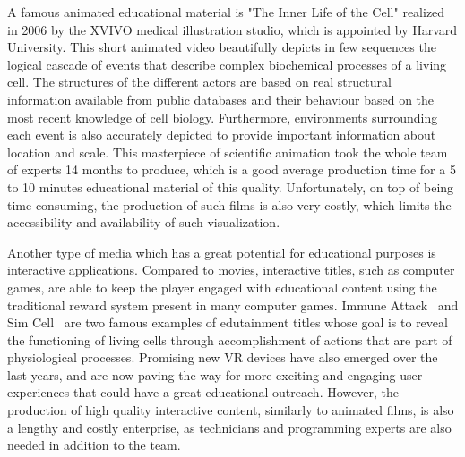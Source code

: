 A famous animated educational material is "The Inner Life of the Cell" \cite{inner2006} realized in 2006 by the XVIVO medical illustration studio, which is appointed by Harvard University.
This short animated video beautifully depicts in few sequences the logical cascade of events that describe complex biochemical processes of a living cell.
The structures of the different actors are based on real structural information available from public databases and their behaviour based on the most recent knowledge of cell biology.
Furthermore, environments surrounding each event is also accurately depicted to provide important information about location and scale.
This masterpiece of scientific animation took the whole team of experts 14 months to produce, which is a good average production time for a 5 to 10 minutes educational material of this quality.
Unfortunately, on top of being time consuming, the production of such films is also very costly, which limits the accessibility and availability of such visualization.

Another type of media which has a great potential for educational purposes is interactive applications.
Compared to movies, interactive titles, such as computer games, are able to keep the player engaged with educational content using the traditional reward system present in many computer games.
Immune Attack~\cite{immune2008} and Sim Cell~\cite{simcell2013} are two famous examples of edutainment titles whose goal is to reveal the functioning of living cells through accomplishment of actions that are part of physiological processes.
Promising new VR devices have also emerged over the last years, and are now paving the way for more exciting and engaging user experiences that could have a great educational outreach.
However, the production of high quality interactive content, similarly to animated films, is also a lengthy and costly enterprise, as technicians and programming experts are also needed in addition to the team.

